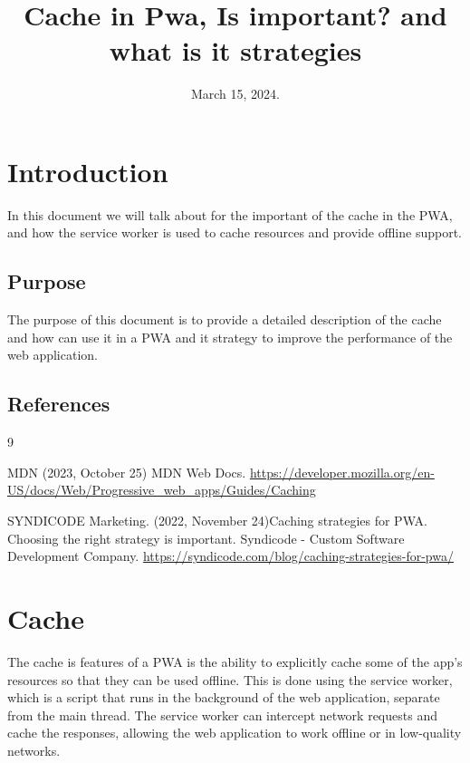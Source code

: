 \documentclass[12pt,a4paper, twosite]{article}
\date{March 15, 2024.}
\title{Cache in Pwa, Is important? and what is it strategies}
\begin{document}
\maketitle

\newpage
\tableofcontents

\newpage

\section{Introduction}
\label{sec:org60390fa}

In this document we will talk about for the important of the cache in the PWA, and how the service worker is used to cache resources and provide offline support.

\subsection{Purpose}
\label{sec:org434c3ef}

The purpose of this document is to provide a detailed description of the cache and how can use it in a PWA and it strategy to improve the performance of the web application.

\subsection{References}
\label{sec:org62711e0}

\begin{thebibliography}
{9}

 MDN (2023, October 25) MDN Web Docs.  \url{https://developer.mozilla.org/en-US/docs/Web/Progressive_web_apps/Guides/Caching}

 SYNDICODE Marketing. (2022, November 24)Caching strategies for PWA. Choosing the right strategy is important. Syndicode - Custom Software Development Company. \url{https://syndicode.com/blog/caching-strategies-for-pwa/}


\end{thebibliography}


\section{Cache}
\label{sec:orgc1c4017}
The cache is features of a PWA is the ability to explicitly cache some of the app's resources so that they can be used offline. This is done using the service worker, which is a script that runs in the background of the web application, separate from the main thread. The service worker can intercept network requests and cache the responses, allowing the web application to work offline or in low-quality networks.
\end{document}
